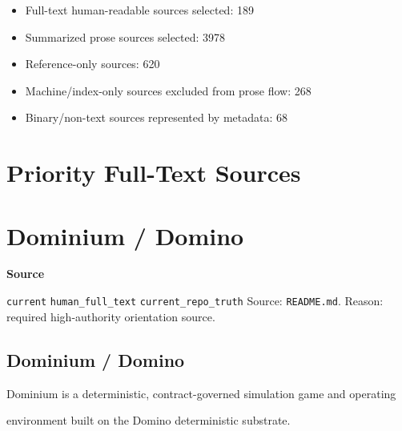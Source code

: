 \documentclass[9pt,a4paper,openany]{book}
\newcommand{\vonecallout}[3]{\par\medskip\noindent\begingroup\setlength{\fboxsep}{7pt}\colorbox{DomCalloutBg}{\parbox{0.94\linewidth}{\textbf{\textcolor{#1}{#2}}\par #3}}\endgroup\par\medskip}
\begin{document}
\begin{itemize}
\item Full-\allowbreak{}text human-\allowbreak{}readable sources selected: 189
\end{itemize}

\begin{itemize}
\item Summarized prose sources selected: 3978
\end{itemize}

\begin{itemize}
\item Reference-\allowbreak{}only sources: 620
\end{itemize}

\begin{itemize}
\item Machine/\allowbreak{}index-\allowbreak{}only sources excluded from prose flow: 268
\end{itemize}

\begin{itemize}
\item Binary/\allowbreak{}non-\allowbreak{}text sources represented by metadata: 68
\end{itemize}



\section{Priority Full-Text Sources}



\section{Dominium / Domino}

\vonecallout{DomSlate}{Source}{\texttt{current} \texttt{human\_\allowbreak{}full\_\allowbreak{}text} \texttt{current\_\allowbreak{}repo\_\allowbreak{}truth} Source: \texttt{README.\allowbreak{}md}.\allowbreak{} Reason: required high-\allowbreak{}authority orientation source.\allowbreak{}}

\subsection{Dominium / Domino}

Dominium is a deterministic, contract-\allowbreak{}governed simulation game and operating

environment built on the Domino deterministic substrate.\allowbreak{}
\end{document}
